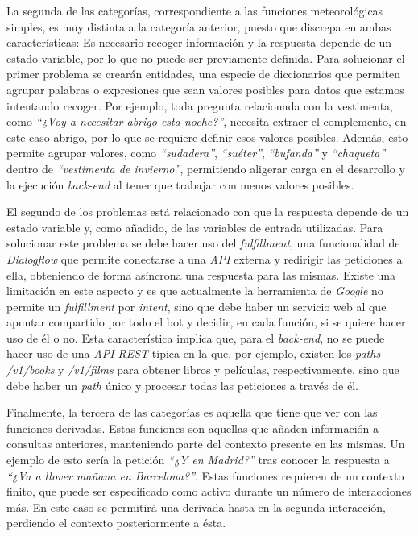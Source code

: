 \documentclass[11pt,spanish,listoffigures]{tfgetsinf}
\begin{document}
La segunda de las categorías, correspondiente a las funciones meteorológicas simples, es muy distinta a la categoría anterior, puesto que discrepa en ambas características: Es necesario recoger información y la respuesta depende de un estado variable, por lo que no puede ser previamente definida. Para solucionar el primer problema se crearán entidades, una especie de diccionarios que permiten agrupar palabras o expresiones que sean valores posibles para datos que estamos intentando recoger. Por ejemplo, toda pregunta relacionada con la vestimenta, como \textit{“¿Voy a necesitar abrigo esta noche?”}, necesita extraer el complemento, en este caso abrigo, por lo que se requiere definir esos valores posibles. Además, esto permite agrupar valores, como \textit{“sudadera”}, \textit{“suéter”}, \textit{“bufanda”} y \textit{“chaqueta”} dentro de \textit{“vestimenta de invierno”}, permitiendo aligerar carga en el desarrollo y la ejecución \textit{back-end} al tener que trabajar con menos valores posibles.

El segundo de los problemas está relacionado con que la respuesta depende de un estado variable y, como añadido, de las variables de entrada utilizadas. Para solucionar este problema se debe hacer uso del \textit{fulfillment}, una funcionalidad de \textit{Dialogflow} que permite conectarse a una \textit{API} externa y redirigir las peticiones a ella, obteniendo de forma asíncrona una respuesta para las mismas. Existe una limitación en este aspecto y es que actualmente la herramienta de \textit{Google} no permite un \textit{fulfillment} por \textit{intent}, sino que debe haber un servicio web al que apuntar compartido por todo el bot y decidir, en cada función, si se quiere hacer uso de él o no. Esta característica implica que, para el \textit{back-end}, no se puede hacer uso de una \textit{API REST} típica en la que, por ejemplo, existen los \textit{\gls{path}s} \textit{/v1/books} y \textit{/v1/films} para obtener libros y películas, respectivamente, sino que debe haber un \textit{path} único y procesar todas las peticiones a través de él.

Finalmente, la tercera de las categorías es aquella que tiene que ver con las funciones derivadas. Estas funciones son aquellas que añaden información a consultas anteriores, manteniendo parte del contexto presente en las mismas. Un ejemplo de esto sería la petición \textit{“¿Y en Madrid?”} tras conocer la respuesta a \textit{“¿Va a llover mañana en Barcelona?”}. Estas funciones requieren de un contexto finito, que puede ser especificado como activo durante un número de interacciones más. En este caso se permitirá una derivada hasta en la segunda interacción, perdiendo el contexto posteriormente a ésta. 
\end{document}

